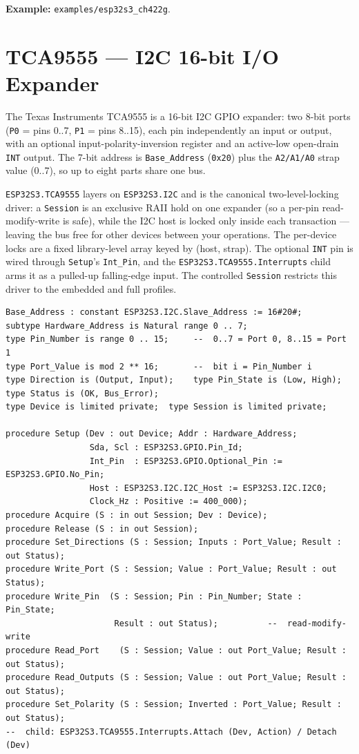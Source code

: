 \noindent\textbf{Example:} \texttt{examples/esp32s3\_ch422g}.

\section{TCA9555 --- I2C 16-bit I/O Expander}
\label{app:ext:tca9555}

The Texas Instruments TCA9555 is a 16-bit I2C GPIO expander: two 8-bit ports
(\texttt{P0} = pins 0..7, \texttt{P1} = pins 8..15), each pin independently an
input or output, with an optional input-polarity-inversion register and an
active-low open-drain \texttt{INT} output. The 7-bit address is
\texttt{Base\_Address} (\texttt{0x20}) plus the \texttt{A2/A1/A0} strap value
(0..7), so up to eight parts share one bus.

\texttt{ESP32S3.TCA9555} layers on \texttt{ESP32S3.I2C} and is the canonical
two-level-locking driver: a \texttt{Session} is an exclusive RAII hold on one
expander (so a per-pin read-modify-write is safe), while the I2C host is locked
only inside each transaction --- leaving the bus free for other devices between
your operations. The per-device locks are a fixed library-level array keyed by
(host, strap). The optional \texttt{INT} pin is wired through \texttt{Setup}'s
\texttt{Int\_Pin}, and the \texttt{ESP32S3.TCA9555.Interrupts} child arms it as a
pulled-up falling-edge input. The controlled \texttt{Session} restricts this
driver to the embedded and full profiles.

\begin{lstlisting}
Base_Address : constant ESP32S3.I2C.Slave_Address := 16#20#;
subtype Hardware_Address is Natural range 0 .. 7;
type Pin_Number is range 0 .. 15;     --  0..7 = Port 0, 8..15 = Port 1
type Port_Value is mod 2 ** 16;       --  bit i = Pin_Number i
type Direction is (Output, Input);    type Pin_State is (Low, High);
type Status is (OK, Bus_Error);
type Device is limited private;  type Session is limited private;

procedure Setup (Dev : out Device; Addr : Hardware_Address;
                 Sda, Scl : ESP32S3.GPIO.Pin_Id;
                 Int_Pin  : ESP32S3.GPIO.Optional_Pin := ESP32S3.GPIO.No_Pin;
                 Host : ESP32S3.I2C.I2C_Host := ESP32S3.I2C.I2C0;
                 Clock_Hz : Positive := 400_000);
procedure Acquire (S : in out Session; Dev : Device);
procedure Release (S : in out Session);
procedure Set_Directions (S : Session; Inputs : Port_Value; Result : out Status);
procedure Write_Port (S : Session; Value : Port_Value; Result : out Status);
procedure Write_Pin  (S : Session; Pin : Pin_Number; State : Pin_State;
                      Result : out Status);          --  read-modify-write
procedure Read_Port    (S : Session; Value : out Port_Value; Result : out Status);
procedure Read_Outputs (S : Session; Value : out Port_Value; Result : out Status);
procedure Set_Polarity (S : Session; Inverted : Port_Value; Result : out Status);
--  child: ESP32S3.TCA9555.Interrupts.Attach (Dev, Action) / Detach (Dev)
\end{lstlisting}

